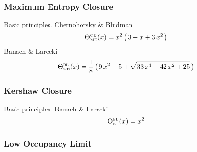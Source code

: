 \subsubsection{Maximum Entropy Closure}
Basic principles.  
Chernohorsky \& Bludman \cite{cernohorskyBludman_1994}
\begin{equation}
  \Theta_{\mbox{\tiny ME}}^{\mbox{\tiny CB}}(x)
  =x^{2}\,\big(\,3-x+3\,x^{2}\,\big)
\end{equation}
Banach \& Larecki
\begin{equation}
  \Theta_{\mbox{\tiny ME}}^{\mbox{\tiny BL}}(x)
  =\frac{1}{8}\,\big(\,9\,x^{2}-5+\sqrt{33\,x^{4}-42\,x^{2}+25}\,\big)
\end{equation}

\subsubsection{Kershaw Closure}
Basic principles.  
Banach \& Larecki \cite{banachLarecki_2017}
\begin{equation}
  \Theta_{\mbox{\tiny K}}^{\mbox{\tiny BL}}(x)=x^{2}
\end{equation}

\subsubsection{Low Occupancy Limit}


